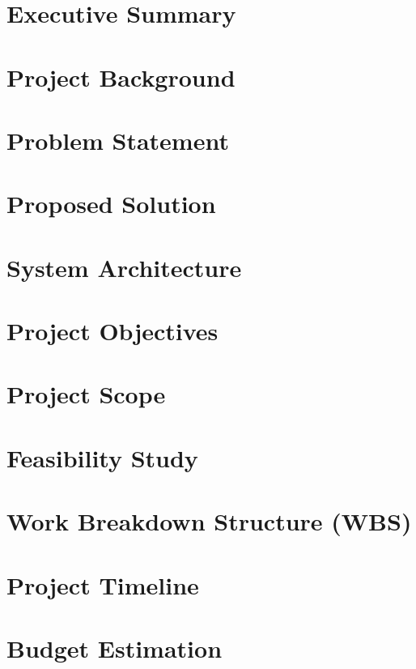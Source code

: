 \documentclass[12pt,a4paper]{article}
\begin{document}



\newpage

\tableofcontents

\newpage


\section{Executive Summary}


\section{Project Background}


\section{Problem Statement}


\section{Proposed Solution}


\section{System Architecture}


\section{Project Objectives}


\section{Project Scope}


\section{Feasibility Study}


\section{Work Breakdown Structure (WBS)}


\section{Project Timeline}


\section{Budget Estimation}




\newpage


\nocite{*}



\end{document}
